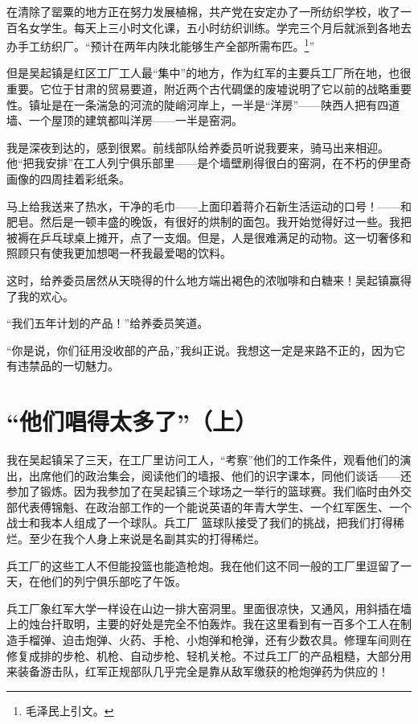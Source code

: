 \documentclass[10pt]{book}
\begin{document}
在清除了罂粟的地方正在努力发展植棉，共产党在安定办了一所纺织学校，收了一百名女学生。每天上三小时文化课，五小时纺织训练。学完三个月后就派到各地去办手工纺织厂。“预计在两年内陕北能够生产全部所需布匹。\footnote{毛泽民上引文。}”

但是吴起镇是红区工厂工人最“集中”的地方，作为红军的主要兵工厂所在地，也很重要。它位于甘肃的贸易要道，附近两个古代碉堡的废墟说明了它以前的战略重要性。镇址是在一条湍急的河流的陡峭河岸上，一半是“洋房”——陕西人把有四道墙、一个屋顶的建筑都叫洋房——一半是窑洞。

我是深夜到达的，感到很累。前线部队给养委员听说我要来，骑马出来相迎。他“把我安排”在工人列宁俱乐部里——是个墙壁刷得很白的窑洞，在不朽的伊里奇画像的四周挂着彩纸条。

马上给我送来了热水，干净的毛巾——上面印着蒋介石新生活运动的口号！——和肥皂。然后是一顿丰盛的晚饭，有很好的烘制的面包。我开始觉得好过一些。我把被褥在乒乓球桌上摊开，点了一支烟。但是，人是很难满足的动物。这一切奢侈和照顾只有使我更加想喝一杯我最爱喝的饮料。

这时，给养委员居然从天晓得的什么地方端出褐色的浓咖啡和白糖来！吴起镇赢得了我的欢心。

“我们五年计划的产品！”给养委员笑道。

“你是说，你们征用没收部的产品，”我纠正说。我想这一定是来路不正的，因为它有违禁品的一切魅力。



\section{“他们唱得太多了”（上）}

我在吴起镇呆了三天，在工厂里访问工人，“考察”他们的工作条件，观看他们的演出，出席他们的政治集会，阅读他们的墙报、他们的识字课本，同他们谈话——还参加了锻炼。因为我参加了在吴起镇三个球场之一举行的篮球赛。我们临时由外交部代表傅锦魁、在政治部工作的一个能说英语的年青大学生、一个红军医生、一个战士和我本人组成了一个球队。兵工厂 篮球队接受了我们的挑战，把我们打得稀烂。至少在我个人身上来说是名副其实的打得稀烂。

兵工厂的这些工人不但能投篮也能造枪炮。我在他们这不同一般的工厂里逗留了一天，在他们的列宁俱乐部吃了午饭。

兵工厂象红军大学一样设在山边一排大窑洞里。里面很凉快，又通风，用斜插在墙上的烛台扦取明，主要的好处是完全不怕轰炸。我在这里看到有一百多个工人在制造手榴弹、迫击炮弹、火药、手枪、小炮弹和枪弹，还有少数农具。修理车间则在修复成排的步枪、机枪、自动步枪、轻机关枪。不过兵工厂的产品粗糙，大部分用来装备游击队，红军正规部队几乎完全是靠从敌军缴获的枪炮弹药为供应的！
\end{document}
